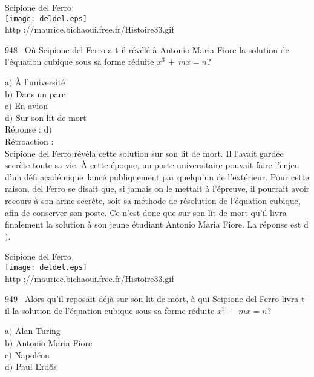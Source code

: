 ﻿\documentclass[letterpaper, 12pt]{article}
\begin{document}
        \begin{center}
        Scipione del Ferro\\
    \texttt{[image: deldel.eps]}\\
        {\footnotesize http ://maurice.bichaoui.free.fr/Histoire33.gif}
    \end{center}

948-- O\`u Scipione del Ferro a-t-il r\'ev\'el\'e \`a Antonio Maria
Fiore la solution de l'\'equation cubique sous sa forme r\'eduite
$x^3\,+\,mx=n$?

a$)$ \`A l'universit\'e \\
b$)$ Dans un parc \\
c$)$ En avion \\
d$)$ Sur son lit de mort\\

R\'eponse : d$)$\\

R\'etroaction : \\
Scipione del Ferro r\'ev\'ela cette solution sur son lit de mort. Il
l'avait gard\'ee secr\`ete toute sa vie. \`A cette \'epoque, un
poste universitaire pouvait faire l'enjeu d'un \og d\'efi
acad\'emique\fg\ lanc\'e publiquement par quelqu'un de
l'ext\'erieur. Pour cette raison, del Ferro se disait que, si jamais
on le mettait \`a l'\'epreuve, il pourrait avoir recours \`a son
arme secr\`ete, soit sa m\'ethode de r\'esolution de l'\'equation
cubique, afin de conserver son poste. Ce n'est donc que sur son lit
de mort qu'il livra finalement la solution \`a son jeune
\'etudiant Antonio Maria Fiore. La r\'eponse est d$)$.\\

        \begin{center}
        Scipione del Ferro\\
    \texttt{[image: deldel.eps]}\\
        {\footnotesize http ://maurice.bichaoui.free.fr/Histoire33.gif}
    \end{center}

949-- Alors qu'il reposait d\'ej\`a sur son lit de mort, \`a qui
Scipione del Ferro livra-t-il la solution de l'\'equation cubique
sous sa forme r\'eduite $x^3\,+\,mx=n$?

a$)$ Alan Turing \\
b$)$ Antonio Maria Fiore \\
c$)$ Napol\'eon \\
d$)$ Paul Erd\H{o}s\\
\end{document}
